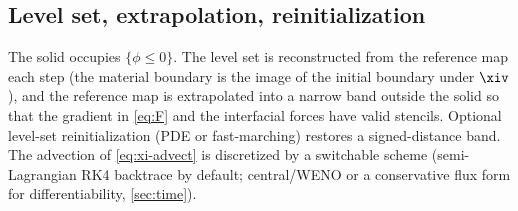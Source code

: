\subsection{Level set, extrapolation, reinitialization}
The solid occupies $\{\phi\le0\}$. The level set is reconstructed from the reference map
each step (the material boundary is the image of the initial boundary under $\xiv$), and
the reference map is extrapolated into a narrow band outside the solid so that the
gradient in \cref{eq:F} and the interfacial forces have valid stencils. Optional
level-set reinitialization (PDE or fast-marching) restores a signed-distance band. The
advection of \cref{eq:xi-advect} is discretized by a switchable scheme (semi-Lagrangian
RK4 backtrace by default; central/WENO or a conservative flux form for
differentiability, \cref{sec:time}).
